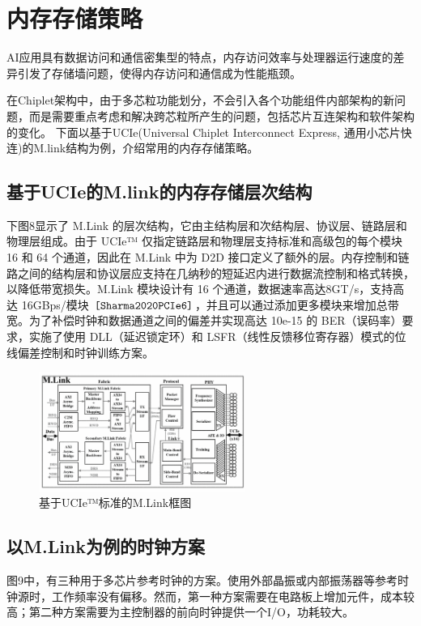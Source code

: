\section{内存存储策略}

AI应用具有数据访问和通信密集型的特点，内存访问效率与处理器运行速度的差异引发了存储墙问题，使得内存访问和通信成为性能瓶颈。

在Chiplet架构中，由于多芯粒功能划分，不会引入各个功能组件内部架构的新问题，而是需要重点考虑和解决跨芯粒所产生的问题，包括芯片互连架构和软件架构的变化。
下面以基于UCIe(Universal Chiplet Interconnect Express, 通用小芯片快连)的M.link结构为例，介绍常用的内存存储策略。

\subsection{基于UCIe的M.link的内存存储层次结构}

下图8显示了 M.Link 的层次结构，它由主结构层和次结构层、协议层、链路层和物理层组成。由于 UCIe™ 仅指定链路层和物理层支持标准和高级包的每个模块 16 和 64 个通道，因此在 M.Link 中为 D2D 接口定义了额外的层。内存控制和链路之间的结构层和协议层应支持在几纳秒的短延迟内进行数据流控制和格式转换，以降低带宽损失。M.Link 模块设计有 16 个通道，数据速率高达8GT/s，支持高达 16GBps/模块 $\texttt{\cite{Sharma2020PCIe6}}$，并且可以通过添加更多模块来增加总带宽。为了补偿时钟和数据通道之间的偏差并实现高达 10e-15 的 BER（误码率）要求，实施了使用 DLL（延迟锁定环）和 LSFR（线性反馈移位寄存器）模式的位线偏差控制和时钟训练方案。

\begin{figure}[htbp]
	\centering
	\includegraphics[width=0.6\textwidth]{img/4-1.png} %
	\caption{基于UCIe™标准的M.Link框图 \cite{10848977}}
	\label{fig:example}
\end{figure}

\subsection{以M.Link为例的时钟方案}
图9中，有三种用于多芯片参考时钟的方案。使用外部晶振或内部振荡器等参考时钟源时，工作频率没有偏移。然而，第一种方案需要在电路板上增加元件，成本较高；第二种方案需要为主控制器的前向时钟提供一个I/O，功耗较大。

